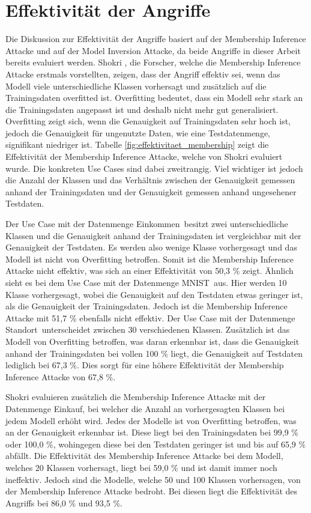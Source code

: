 \section{Effektivität der Angriffe}\label{sec:dis_angriffe}
Die Diskussion zur Effektivität der Angriffe basiert auf der Membership Inference Attacke und auf der Model Inversion Attacke, da beide Angriffe in dieser Arbeit bereits evaluiert werden.
Shokri \etal \cite{P-2}, die Forscher, welche die Membership Inference Attacke erstmals vorstellten, zeigen, dass der Angriff effektiv sei, wenn das Modell viele unterschiedliche Klassen vorhersagt und zusätzlich auf die Trainingsdaten overfitted ist.
Overfitting bedeutet, dass ein Modell sehr stark an die Trainingsdaten angepasst ist und deshalb nicht mehr gut generalisiert.
Overfitting zeigt sich, wenn die Genauigkeit auf Trainingsdaten sehr hoch ist, jedoch die Genauigkeit für ungenutzte Daten, wie eine Testdatenmenge, signifikant niedriger ist.
Tabelle \ref{fig:effektivitaet_membership} zeigt die Effektivität der Membership Inference Attacke, welche von Shokri \etal \cite{P-2} evaluiert wurde. 
Die konkreten Use Cases sind dabei zweitrangig. 
Viel wichtiger ist jedoch die Anzahl der Klassen und das Verhältnis zwischen der Genauigkeit gemessen anhand der Trainingsdaten und der Genauigkeit gemessen anhand ungesehener Testdaten.



Der Use Case mit der Datenmenge \dq Einkommen\dq\ besitzt zwei unterschiedliche Klassen und die Genauigkeit anhand der Trainingsdaten ist vergleichbar mit der Genauigkeit der Testdaten.
Es werden also wenige Klasse vorhergesagt und das Modell ist nicht von Overfitting betroffen.
Somit ist die Membership Inference Attacke nicht effektiv, was sich an einer Effektivität von 50,3 \% zeigt.
Ähnlich sieht es bei dem Use Case mit der Datenmenge \dq MNIST\dq\ aus. 
Hier werden 10 Klasse vorhergesagt, wobei die Genauigkeit auf den Testdaten etwas geringer ist, als die Genauigkeit der Trainingsdaten. 
Jedoch ist die Membership Inference Attacke mit 51,7 \% ebenfalls nicht effektiv.
Der Use Case mit der Datenmenge \dq Standort\dq\ unterscheidet zwischen 30 verschiedenen Klassen.
Zusätzlich ist das Modell von Overfitting betroffen, was daran erkennbar ist, dass die Genauigkeit anhand der Trainingsdaten bei vollen 100 \% liegt, die Genauigkeit auf Testdaten lediglich bei 67,3 \%.
Dies sorgt für eine höhere Effektivität der Membership Inference Attacke von 67,8 \%.

Shokri \etal \cite{P-2} evaluieren zusätzlich die Membership Inference Attacke mit der Datenmenge \dq Einkauf\dq, bei welcher die Anzahl an vorhergesagten Klassen bei jedem Modell erhöht wird.
Jedes der Modelle ist von Overfitting betroffen, was an der Genauigkeit erkennbar ist.
Diese liegt bei den Trainingsdaten bei 99,9 \% oder 100,0 \%, wohingegen diese bei den Testdaten geringer ist und bis auf 65,9 \% abfällt.
Die Effektivität des Membership Inference Attacke bei dem Modell, welches 20 Klassen vorhersagt, liegt bei 59,0 \% und ist damit immer noch ineffektiv.
Jedoch sind die Modelle, welche 50 und 100 Klassen vorhersagen, von der Membership Inference Attacke bedroht. 
Bei diesen liegt die Effektivität des Angriffs bei 86,0 \% und 93,5 \%.

